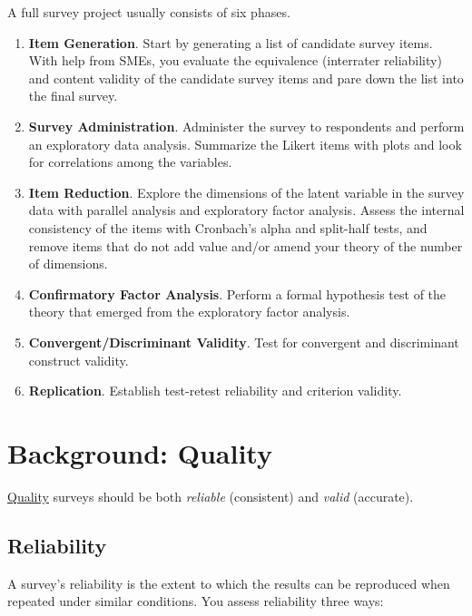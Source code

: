 \documentclass[
]{book}
\theoremstyle{definition}
\theoremstyle{definition}
\theoremstyle{definition}
\theoremstyle{definition}
\theoremstyle{remark}
\begin{document}
A full survey project usually consists of six phases.

\begin{enumerate}
\def\labelenumi{\arabic{enumi}.}
\item
  \textbf{Item Generation}. Start by generating a list of candidate survey items. With help from SMEs, you evaluate the equivalence (interrater reliability) and content validity of the candidate survey items and pare down the list into the final survey.
\item
  \textbf{Survey Administration}. Administer the survey to respondents and perform an exploratory data analysis. Summarize the Likert items with plots and look for correlations among the variables.
\item
  \textbf{Item Reduction}. Explore the dimensions of the latent variable in the survey data with parallel analysis and exploratory factor analysis. Assess the internal consistency of the items with Cronbach's alpha and split-half tests, and remove items that do not add value and/or amend your theory of the number of dimensions.
\item
  \textbf{Confirmatory Factor Analysis}. Perform a formal hypothesis test of the theory that emerged from the exploratory factor analysis.
\item
  \textbf{Convergent/Discriminant Validity}. Test for convergent and discriminant construct validity.
\item
  \textbf{Replication}. Establish test-retest reliability and criterion validity.
\end{enumerate}

\hypertarget{background-quality}{%
\section{Background: Quality}\label{background-quality}}

\href{https://www.scribbr.com/methodology/reliability-vs-validity/}{Quality} surveys should be both \emph{reliable} (consistent) and \emph{valid} (accurate).

\hypertarget{reliability}{%
\subsection{Reliability}\label{reliability}}

A survey's reliability is the extent to which the results can be reproduced when repeated under similar conditions. You assess reliability three ways:
\end{document}
